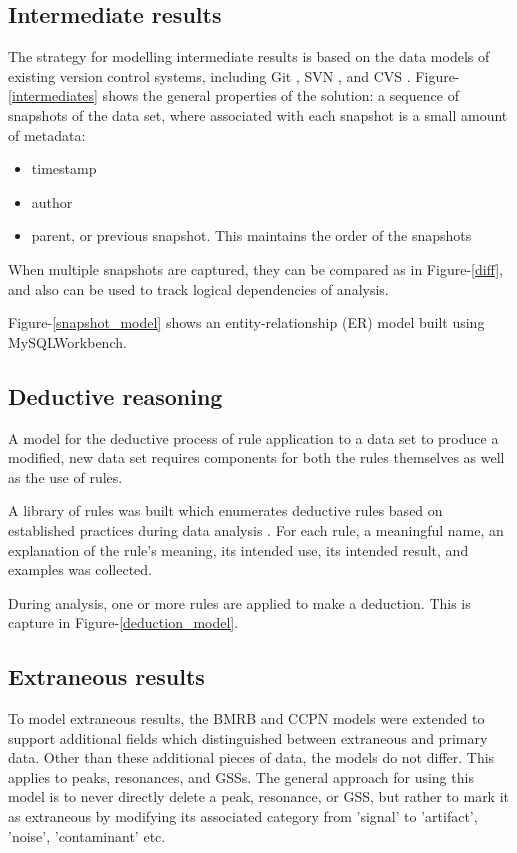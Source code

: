 \subsection{Intermediate results}
The strategy for modelling intermediate results is based on the data models
of existing version control systems, including Git \cite{loeliger2012git},
SVN \cite{svn}, and CVS \cite{cvs}.  Figure-\ref{intermediates} shows the
general properties of the solution: a sequence of snapshots of the data set,
where associated with each snapshot is a small amount of metadata:
\begin{itemize}
 \item timestamp
 \item author
 \item parent, or previous snapshot.  This maintains the order of the 
  snapshots
\end{itemize}

When multiple snapshots are captured, they can be compared as in Figure-\ref{diff},
and also can be used to track logical dependencies of analysis.

Figure-\ref{snapshot_model} shows an entity-relationship (ER) model built
using MySQLWorkbench.

\subsection{Deductive reasoning}
A model for the deductive process of rule application to a data set to 
produce a modified, new data set requires components for both the rules 
themselves as well as the use of rules.  

A library of rules was built which enumerates deductive rules based on 
established practices during data analysis \cite{guerry2011automated, hncacb,
hnco, cbcaconh, hbhaconh, picky, xeasy, sparky, ccpn}.  For each rule, 
a meaningful name, an explanation of the rule's meaning, its intended use,
its intended result, and examples was collected.

During analysis, one or more rules are applied to make a deduction.  This
is capture in Figure-\ref{deduction_model}.


\subsection{Extraneous results}
To model extraneous results, the BMRB and CCPN models \cite{bmrb, ccpn}
were extended to support additional fields which distinguished between 
extraneous and primary data.  Other than these additional pieces of data,
the models do not differ.  This applies to peaks, resonances, and GSSs.
The general approach for using this model is to never directly delete
a peak, resonance, or GSS, but rather to mark it as extraneous by modifying
its associated category from 'signal' to 'artifact', 'noise', 'contaminant'
etc.

